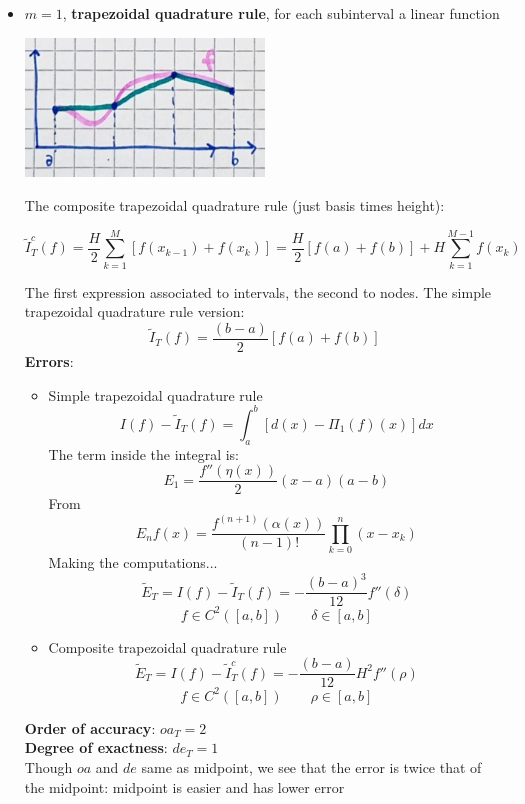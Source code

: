 \begin{itemize}
    \item $m=1$, \textbf{trapezoidal quadrature rule}, for each subinterval a linear function
    \begin{center}
        \includegraphics[width=0.5\textwidth]{images/quadrature_m1.png}
    \end{center}
    The composite trapezoidal quadrature rule (just basis times height):
    \begin{LARGE}
        $$
        \tilde{I}_{T}^c(f)=
        \frac{H}{2}
        \sum_{k=1}^M
        \left[
            f(x_{k-1})+f(x_k)
        \right]=
        \frac{H}{2}
        \left[
            f(a)+f(b)
        \right]+
        H\sum_{k=1}^{M-1}f(x_k)
        $$
    \end{LARGE}
    The first expression associated to intervals, the second to nodes. The simple trapezoidal quadrature rule version:
    $$
    \tilde{I}_T(f)=\frac{(b-a)}{2}\left[f(a)+f(b)\right]
    $$
    \textbf{Errors}:
    \begin{itemize}
        \item Simple trapezoidal quadrature rule
        $$
        I(f)-\tilde{I}_T(f)=\int_a^b\left[d(x)-\Pi_1(f)(x)\right]dx
        $$
        The term inside the integral is:
        $$
        E_1=\frac{f''(\eta(x))}{2}(x-a)(a-b)
        $$
        From
        $$
        E_nf(x)=\frac{f^{(n+1)}(\alpha(x))}{(n-1)!}\prod_{k=0}^n(x-x_k)
        $$
        Making the computations...
        $$
        \tilde{E}_T=I(f)-\tilde{I}_T(f)=
        -\frac{(b-a)^3}{12}f''(\delta)
        $$
        $$
        f\in C^2([a,b])\qquad\delta\in[a,b]
        $$
        \item Composite trapezoidal quadrature rule
        $$
        \tilde{E}_T=I(f)-\tilde{I}_T^c(f)=
        -\frac{(b-a)}{12}H^2f''(\rho)
        $$
        $$
        f\in C^2([a,b])\qquad\rho\in[a,b]
        $$
    \end{itemize}
    \textbf{Order of accuracy}: $oa_{T}=2$\\
    \textbf{Degree of exactness}: $de_{T}=1$\\
    Though $oa$ and $de$ same as midpoint, we see that the error is twice that of the midpoint: midpoint is easier and has lower error

\end{itemize}
